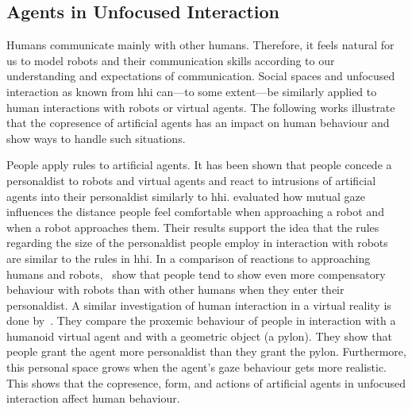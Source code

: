 \subsection{Agents in Unfocused Interaction}\label{sec.rw.hi.unfocused-rw}

Humans communicate mainly with other humans.
Therefore, it feels natural for us to model \glspl{robot} and their communication skills according to our understanding and expectations of communication.
Social spaces and \gls{unfocused interaction} as known from \acrfull{hhi} can---to some extent---be similarly applied to human interactions with \glspl{robot} or \glspl{virtual agent}. 
The following works illustrate that the \gls{copresence} of \glspl{artificial agent} has an impact on human behaviour and show ways to handle such situations.

People apply  rules to \glspl{artificial agent}.
It has been shown that people concede a \gls{personaldist} to \glspl{robot} and \glspl{virtual agent} and react to intrusions of \glspl{artificial agent} into their \gls{personaldist} similarly to \gls{hhi}.
 evaluated how mutual gaze influences the distance people feel comfortable when approaching a \gls{robot} and when a \gls{robot} approaches them.
Their results support the idea that the  rules regarding the size of the \gls{personaldist} people employ in interaction with \glspl{robot} are similar to the rules in \gls{hhi}.
In a comparison of reactions to approaching humans and \glspl{robot},~ show that people tend to show even more compensatory behaviour with \glspl{robot} than with other humans when they enter their \gls{personaldist}.
A similar investigation of human interaction in a virtual reality is done by~.
They compare the proxemic behaviour of people in interaction with a humanoid \gls{virtual agent} and with a geometric object (a pylon).
They show that people grant the agent more \gls{personaldist} than they grant the pylon.
Furthermore, this personal space grows when the agent's gaze behaviour gets more realistic.
This shows that the \gls{copresence}, form, and actions of \glspl{artificial agent} in \gls{unfocused interaction} affect human behaviour.

